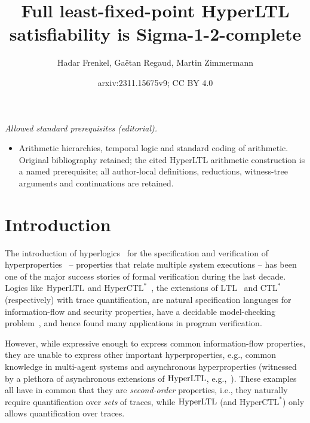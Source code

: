 \documentclass[dvipsnames,10pt,a4paper]{amsart}
\title{Full least-fixed-point HyperLTL satisfiability is Sigma-1-2-complete}
\author{Hadar Frenkel, Gaëtan Regaud, Martin Zimmermann}
\date{arxiv:2311.15675v9; CC BY 4.0}
\theoremstyle{definition}
\theoremstyle{remark}
\newcommand{\ltl}{\mathrm{LTL}\xspace}
\newcommand{\ctlstar}{\mathrm{CTL^*}\xspace}
\newcommand{\hyltl}{\mathrm{Hyper\-LTL}\xspace}
\newcommand{\hyctlstar}{\mathrm{HyperCTL^*}\xspace}
\begin{document}
\maketitle
\noindent\textit{Allowed standard prerequisites (editorial).}\begin{itemize}
\item Arithmetic hierarchies, temporal logic and standard coding of arithmetic. Original bibliography retained; the cited HyperLTL arithmetic construction is a named prerequisite; all author-local definitions, reductions, witness-tree arguments and continuations are retained.
\end{itemize}\medskip

\section{Introduction}
\label{sec:intro}

The introduction of hyperlogics~\cite{ClarksonFKMRS14} for the specification and verification of hyperproperties~\cite{ClarksonS10} -- properties that relate multiple system executions -- has been one of the major success stories of formal verification during the last decade.
Logics like $\hyltl$ and $\hyctlstar$~\cite{ClarksonFKMRS14}, the extensions of $\ltl$~\cite{Pnueli77} 
and $\ctlstar$~\cite{EmersonH86} (respectively) with trace quantification, are natural specification languages for information-flow and security properties, have a decidable model-checking problem~\cite{FinkbeinerRS15}, and hence found many applications in program verification.

However, while expressive enough to express common information-flow properties, they are unable to express other important hyperproperties, e.g., common knowledge in multi-agent systems and asynchronous hyperproperties (witnessed by a plethora of asynchronous extensions of $\hyltl$, e.g.,~\cite{BartocciHNC23,DBLP:conf/cav/BaumeisterCBFS21,BeutnerF23,DBLP:journals/corr/abs-2404-16778,DBLP:conf/lics/BozzelliPS21,DBLP:conf/concur/BozzelliPS22,DBLP:journals/pacmpl/GutsfeldMO21,DBLP:conf/mfcs/KontinenSV23,KontinenSV24,DBLP:conf/mfcs/KrebsMV018}).
These examples all have in common that they are \emph{second-order} properties, i.e., they naturally require quantification over \emph{sets} of traces, while $\hyltl$ (and $\hyctlstar$) only allows quantification over traces.
\end{document}
